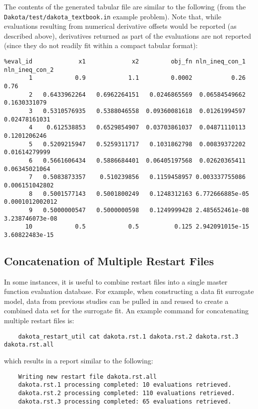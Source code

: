 The contents of the generated tabular file are similar to the following 
(from the \\
\texttt{Dakota/test/dakota\_textbook.in} example problem). Note that,
while evaluations resulting from numerical derivative offsets would be
reported (as described above), derivatives returned as part of the
evaluations are not reported (since they do not readily fit within a
compact tabular format):
\begin{small}
\begin{verbatim}
%eval_id             x1             x2         obj_fn nln_ineq_con_1 nln_ineq_con_2
       1            0.9            1.1         0.0002           0.26           0.76
       2   0.6433962264   0.6962264151   0.0246865569  0.06584549662   0.1630331079
       3   0.5310576935   0.5388046558  0.09360081618  0.01261994597  0.02478161031
       4    0.612538853   0.6529854907  0.03703861037  0.04871110113   0.1201206246
       5   0.5209215947   0.5259311717   0.1031862798  0.00839372202  0.01614279999
       6   0.5661606434   0.5886684401  0.06405197568  0.02620365411  0.06345021064
       7   0.5083873357    0.510239856   0.1159458957 0.003337755086 0.006151042802
       8   0.5001577143   0.5001800249   0.1248312163 6.772666885e-05 0.0001012002012
       9   0.5000000547   0.5000000598   0.1249999428 2.485652461e-08 3.238746073e-08
      10            0.5            0.5          0.125 2.942091015e-15 3.60822483e-15
\end{verbatim}
\end{small}

\subsection{Concatenation of Multiple Restart Files}\label{restart:utility:concatenation}

In some instances, it is useful to combine restart files into a single
master function evaluation database. For example, when constructing a
data fit surrogate model, data from previous studies can be pulled in
and reused to create a combined data set for the surrogate fit. An
example command for concatenating multiple restart files is:
\begin{small}
\begin{verbatim}
    dakota_restart_util cat dakota.rst.1 dakota.rst.2 dakota.rst.3 dakota.rst.all
\end{verbatim}
\end{small}
which results in a report similar to the following:
\begin{verbatim}
    Writing new restart file dakota.rst.all
    dakota.rst.1 processing completed: 10 evaluations retrieved.
    dakota.rst.2 processing completed: 110 evaluations retrieved.
    dakota.rst.3 processing completed: 65 evaluations retrieved.
\end{verbatim}

